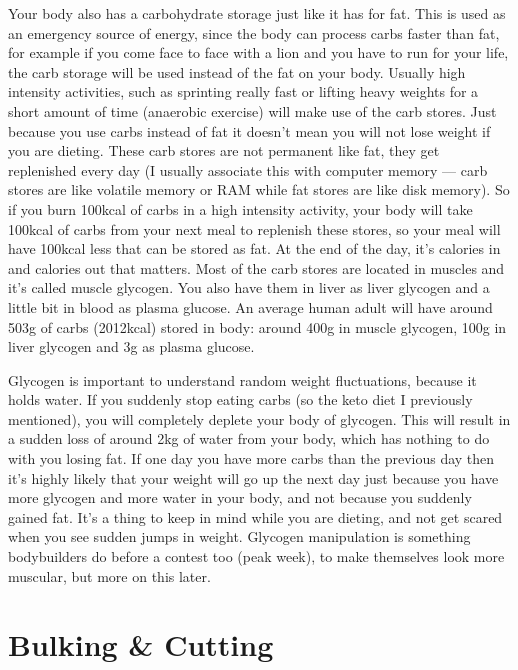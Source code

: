\documentclass[openany, 12pt]{book}
\begin{document}
	Your body also has a carbohydrate storage just like it has for fat. This is used as an emergency source of energy, since the body can process carbs faster than fat, 
	for example if you come face to face with a lion and you have to run for your life, the carb storage will be used instead of the fat on your body. 
	Usually high intensity activities, such as sprinting really fast or lifting heavy weights for a short amount of time (anaerobic exercise) will make use of the carb stores.
	Just because you use carbs instead of fat it doesn't mean you will not lose weight if you are dieting. These carb stores are not permanent like fat, they get replenished
	every day (I usually associate this with computer memory --- carb stores are like volatile memory or RAM while fat stores are like disk memory). So if you burn 100kcal of
	carbs in a high intensity activity, your body will take 100kcal of carbs from your next meal to replenish these stores, so your meal will have 100kcal less that can be
	stored as fat. At the end of the day, it's calories in and calories out that matters. Most of the carb stores are located in muscles and it's called  muscle glycogen. 
	You also have them in liver as liver glycogen and a little bit in blood as plasma glucose. An average human adult will have around 503g of carbs (2012kcal) stored in body:
	around 400g in muscle glycogen, 100g in liver glycogen and 3g as plasma glucose.  
	
	Glycogen is important to understand random weight fluctuations, because it holds water. If you suddenly stop eating carbs (so the keto diet I previously mentioned), you will
	completely deplete your body of glycogen. This will result in a sudden loss of around 2kg of water from your body, which has nothing to do with you losing fat. If one day you
	have more carbs than the previous day then it's highly likely that your weight will go up the next day just because you have more glycogen and more water in your body, and not
	because you suddenly gained fat. It's a thing to keep in mind while you are dieting, and not get scared when you see sudden jumps in weight. Glycogen manipulation is something
	bodybuilders do before a contest too (peak week), to make themselves look more muscular, but more on this later.
		
	\section{Bulking \& Cutting}	
	
\end{document}
